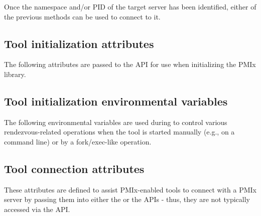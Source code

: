 Once the namespace and/or \ac{PID} of the target server has been identified, either of the previous methods can be used to connect to it.


\subsection{Tool initialization attributes}
\label{api:tools:attributes:tool}

The following attributes are passed to the  \ac{API} for use when initializing the \ac{PMIx} library.

%

%

%

\subsection{Tool initialization environmental variables}
\label{api:tools:envars:tool}

The following environmental variables are used during  to control various rendezvous-related operations when the tool is started manually (e.g., on a command line) or by a fork/exec-like operation.

%

%

\subsection{Tool connection attributes}
\label{api:struct:attributes:connection}

These attributes are defined to assist PMIx-enabled tools to connect with a \ac{PMIx} server by passing them into either the  or the  \acp{API} - thus, they are not typically accessed via the  \ac{API}.


